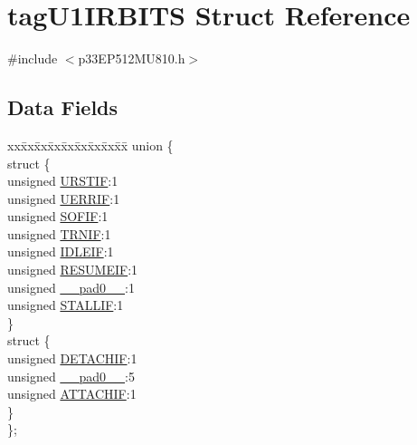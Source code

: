 \hypertarget{structtag_u1_i_r_b_i_t_s}{}\section{tag\+U1\+I\+R\+B\+I\+TS Struct Reference}
\label{structtag_u1_i_r_b_i_t_s}


{\ttfamily \#include $<$p33\+E\+P512\+M\+U810.\+h$>$}

\subsection*{Data Fields}
\begin{DoxyCompactItemize}
\item 
\begin{tabbing}
xx\=xx\=xx\=xx\=xx\=xx\=xx\=xx\=xx\=\kill
union \{\\
\>struct \{\\
\>\>unsigned \hyperlink{structtag_u1_i_r_b_i_t_s_a98694065ad0c4f90e15ef7d41671583b}{URSTIF}:1\\
\>\>unsigned \hyperlink{structtag_u1_i_r_b_i_t_s_a62865712bfe4d793cc34014bb8c39aac}{UERRIF}:1\\
\>\>unsigned \hyperlink{structtag_u1_i_r_b_i_t_s_a0497431e763808b8b75d48f47dd55583}{SOFIF}:1\\
\>\>unsigned \hyperlink{structtag_u1_i_r_b_i_t_s_af1cd33946f647daa45dc0c2a6a54dc99}{TRNIF}:1\\
\>\>unsigned \hyperlink{structtag_u1_i_r_b_i_t_s_a57b687b8931c587c7d949134d72819a5}{IDLEIF}:1\\
\>\>unsigned \hyperlink{structtag_u1_i_r_b_i_t_s_a43bd0e55d5fa367feaf8dddc55d222d3}{RESUMEIF}:1\\
\>\>unsigned \hyperlink{structtag_u1_i_r_b_i_t_s_adf71f3d8410c1f1dbbc96680a92c49af}{\_\_pad0\_\_}:1\\
\>\>unsigned \hyperlink{structtag_u1_i_r_b_i_t_s_ac6d494ee08211089bf1c0bdec3d52919}{STALLIF}:1\\
\>\} \\
\>struct \{\\
\>\>unsigned \hyperlink{structtag_u1_i_r_b_i_t_s_a564686d1a461df6ef6ec84283620afec}{DETACHIF}:1\\
\>\>unsigned \hyperlink{structtag_u1_i_r_b_i_t_s_adf71f3d8410c1f1dbbc96680a92c49af}{\_\_pad0\_\_}:5\\
\>\>unsigned \hyperlink{structtag_u1_i_r_b_i_t_s_a9f79f12c0b7e636aa2c4f639bf30b053}{ATTACHIF}:1\\
\>\} \\
\}; \\

\end{tabbing}\end{DoxyCompactItemize}


